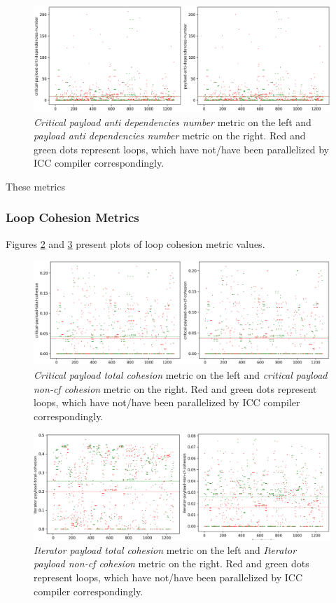\begin{figure}[h]
\centering
\includegraphics[width=\linewidth]{figs/loop-dependencies-number-2.png}
\caption{\textit{Critical payload anti dependencies number} metric on the left and \textit{payload anti dependencies number} metric on the right. Red and green dots represent loops, which have not/have been parallelized by ICC compiler correspondingly.}
\label{loop-dependencies-number-2}
\end{figure} \newline
\null\qquad These metrics 

\subsubsection{Loop Cohesion Metrics}
\label{analysis-loop-cohesion-metrics}
\qquad Figures \ref{loop-cohesion-0} and \ref{loop-cohesion-1} present plots of loop cohesion metric values.   
\begin{figure}[h]
\centering
\includegraphics[width=\linewidth]{figs/loop-cohesion-0.png}
\caption{\textit{Critical payload total cohesion} metric on the left and \textit{critical payload non-cf cohesion} metric on the right. Red and green dots represent loops, which have not/have been parallelized by ICC compiler correspondingly.}
\label{loop-cohesion-0}
\end{figure}
\begin{figure}[h]
\centering
\includegraphics[width=\linewidth]{figs/loop-cohesion-1.png}
\caption{\textit{Iterator payload total cohesion} metric on the left and \textit{Iterator payload non-cf cohesion} metric on the right. Red and green dots represent loops, which have not/have been parallelized by ICC compiler correspondingly.}
\label{loop-cohesion-1}
\end{figure}
